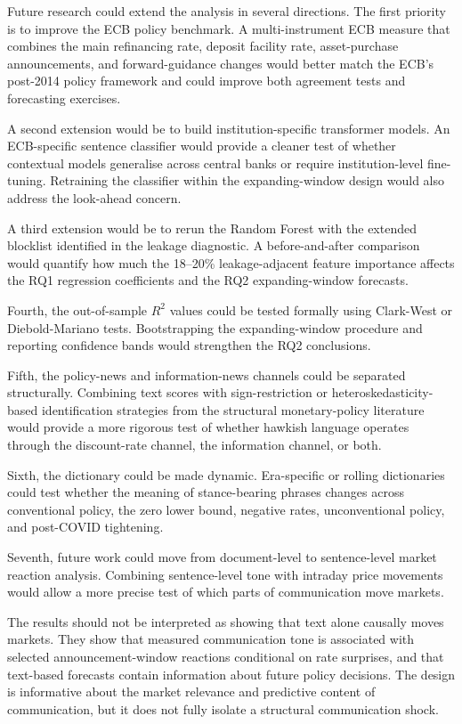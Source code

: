 Future research could extend the analysis in several directions. The first
priority is to improve the ECB policy benchmark. A multi-instrument ECB measure
that combines the main refinancing rate, deposit facility rate, asset-purchase
announcements, and forward-guidance changes would better match the ECB's
post-2014 policy framework and could improve both agreement tests and
forecasting exercises.

A second extension would be to build institution-specific transformer models.
An ECB-specific sentence classifier would provide a cleaner test of whether
contextual models generalise across central banks or require institution-level
fine-tuning. Retraining the classifier within the expanding-window design would
also address the look-ahead concern.

A third extension would be to rerun the Random Forest with the extended
blocklist identified in the leakage diagnostic. A before-and-after comparison
would quantify how much the 18--20\% leakage-adjacent feature importance
affects the RQ1 regression coefficients and the RQ2 expanding-window forecasts.

Fourth, the out-of-sample $R^2$ values could be tested formally using
Clark-West or Diebold-Mariano tests. Bootstrapping the expanding-window
procedure and reporting confidence bands would strengthen the RQ2 conclusions.

Fifth, the policy-news and information-news channels could be separated
structurally. Combining text scores with sign-restriction or
heteroskedasticity-based identification strategies from the structural
monetary-policy literature would provide a more rigorous test of whether
hawkish language operates through the discount-rate channel, the information
channel, or both.

Sixth, the dictionary could be made dynamic. Era-specific or rolling
dictionaries could test whether the meaning of stance-bearing phrases changes
across conventional policy, the zero lower bound, negative rates,
unconventional policy, and post-COVID tightening.

Seventh, future work could move from document-level to sentence-level market
reaction analysis. Combining sentence-level tone with intraday price movements
would allow a more precise test of which parts of communication move markets.

The results should not be interpreted as showing that text alone causally moves
markets. They show that measured communication tone is associated with selected
announcement-window reactions conditional on rate surprises, and that text-based
forecasts contain information about future policy decisions. The design is
informative about the market relevance and predictive content of communication,
but it does not fully isolate a structural communication shock.

